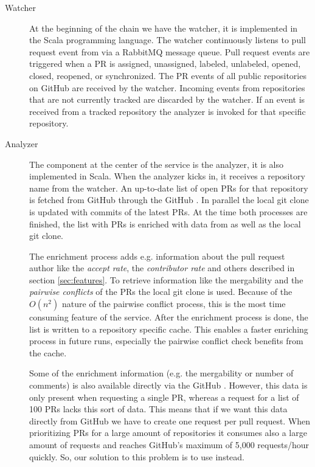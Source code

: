 \begin{description}
\item[Watcher]
At the beginning of the chain we have the watcher, it is implemented in the Scala programming language.
The watcher continuously listens to pull request event from \ghtorrent via a RabbitMQ message queue.
Pull request events are triggered when a PR is assigned, unassigned, labeled, unlabeled, opened, closed, reopened, or synchronized.
The PR events of all public repositories on GitHub are received by the watcher.
Incoming events from repositories that are not currently tracked are discarded by the watcher.
If an event is received from a tracked repository the analyzer is invoked for that specific repository.

\item[Analyzer]
The component at the center of the service is the analyzer, it is also implemented in Scala.
When the analyzer kicks in, it receives a repository name from the watcher.
An up-to-date list of open PRs for that repository is fetched from GitHub through the GitHub \api.
In parallel the local git clone is updated with commits of the latest PRs.
At the time both processes are finished, the list with PRs is enriched with data from \ghtorrent as well as the local git clone.

The enrichment process adds e.g. information about the pull request author like the \emph{accept rate}, the \emph{contributor rate} and others described in section \ref{sec:features}.
To retrieve information like the mergability and the \emph{pairwise conflicts} of the PRs the local git clone is used.
Because of the $O(n^2)$ nature of the pairwise conflict process, this is the most time consuming feature of the service.
After the enrichment process is done, the list is written to a repository specific cache.
This enables a faster enriching process in future runs, especially the pairwise conflict check benefits from the cache.

Some of the enrichment information (e.g. the mergability or number of comments) is also available directly via the GitHub \api.
However, this data is only present when requesting a single PR, whereas a request for a list of 100 PRs lacks this sort of data.
This means that if we want this data directly from GitHub we have to create one \api request per pull request.
When prioritizing PRs for a large amount of repositories it consumes also a large amount of \api requests and reaches GitHub's maximum of 5,000 requests/hour quickly.
So, our solution to this problem is to use \ghtorrent instead.


\end{description}
